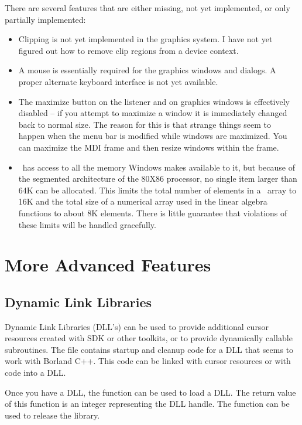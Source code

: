 There are several features that are either missing, not yet
implemented, or only partially implemented:
\begin{itemize}
\item
Clipping is not yet implemented in the graphics system. I have not yet
figured out how to remove clip regions from a device context.
\item
A mouse is essentially required for the graphics windows and dialogs.
A proper alternate keyboard interface is not yet available.
\item
The maximize button on the listener and on graphics windows is
effectively disabled -- if you attempt to maximize a window it is
immediately changed back to normal size. The reason for this is that
strange things seem to happen when the menu bar is modified while
windows are maximized.  You can maximize the MDI frame and then resize
windows within the frame.
\item
\WXLS\ has access to all the memory Windows makes available to it,
but because of the segmented architecture of the 80X86 processor, no
single item larger than 64K can be allocated. This limits the total
number of elements in a \LS\ array to 16K and the total size of a
numerical array used in the linear algebra functions to about 8K
elements. There is little guarantee that violations of these limits
will be handled gracefully.
\end{itemize}

\section{More Advanced Features}
\subsection{Dynamic Link Libraries}
Dynamic Link Libraries (DLL's) can be used to provide additional
cursor resources created with SDK or other toolkits, or to provide
dynamically callable subroutines. The file  contains
startup and cleanup code for a DLL that seems to work with Borland
C++. This code can be linked with cursor resources or with code into a
DLL.

Once you have a DLL, the function  can be used to load
a DLL. The return value of this function is an integer representing
the DLL handle. The function  can be used to release
the library.

